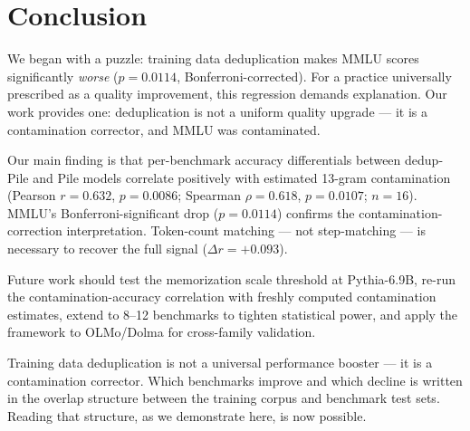 \section{Conclusion}
\label{sec:conclusion}

We began with a puzzle: training data deduplication makes MMLU scores significantly
\textit{worse} ($p = 0.0114$, Bonferroni-corrected). For a practice universally prescribed
as a quality improvement, this regression demands explanation. Our work provides one:
deduplication is not a uniform quality upgrade --- it is a contamination corrector, and
MMLU was contaminated.

Our main finding is that per-benchmark accuracy differentials between dedup-Pile and
Pile models correlate positively with estimated 13-gram contamination (Pearson $r = 0.632$,
$p = 0.0086$; Spearman $\rho = 0.618$, $p = 0.0107$; $n = 16$). MMLU's Bonferroni-significant
drop ($p = 0.0114$) confirms the contamination-correction interpretation. Token-count
matching --- not step-matching --- is necessary to recover the full signal ($\Delta r = +0.093$).

Future work should test the memorization scale threshold at Pythia-6.9B, re-run the
contamination-accuracy correlation with freshly computed contamination estimates,
extend to 8--12 benchmarks to tighten statistical power, and apply the framework to
OLMo/Dolma for cross-family validation.

Training data deduplication is not a universal performance booster --- it is a
contamination corrector. Which benchmarks improve and which decline is written in
the overlap structure between the training corpus and benchmark test sets.
Reading that structure, as we demonstrate here, is now possible.
